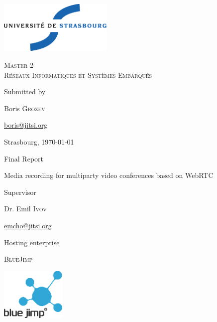 \thispagestyle{empty}

\begin{center}
       \noindent
       \includegraphics[height=2.5cm]{./pics/uds.eps}       
       
       \vfill\vfill

    {\large \textsc{Master 2\\Réseaux Informatiques et Systèmes Embarqués}}

    \bigskip\bigskip

    {\large Submitted by}

    \medskip

    {\large Boris \textsc{Grozev}}
 
    {\small \url{boris@jitsi.org}}

    \medskip
    Strasbourg, \today
    \vfill\vfill


    {\huge \sc
      \begin{center}
		Final Report
      \end{center}}
        \begin{center}
        Media recording for multiparty video conferences based on WebRTC %
        \end{center}

    \vfill\vfill

    {\large Supervisor}

\medskip

    {\large Dr. Emil \textsc{Ivov}}

    {\small \url{emcho@jitsi.org}}

\bigskip

    {\large Hosting enterprise} %

\medskip

    {\large \textsc{BlueJimp}}

\vfill\vfill\vfill
           
       \includegraphics[height=2.5cm]{./pics/bluejimp2.eps}

\end{center}
